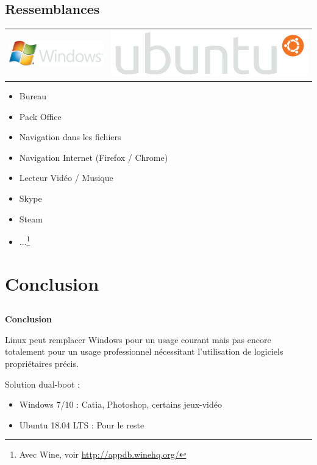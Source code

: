 \documentclass{beamer}
\begin{document}
\subsection{Ressemblances}
\begin{frame}
  
  \begin{center}
\begin{tabular}{c | c}
    \includegraphics[width=0.3\linewidth]{images/Windows_logo}&\includegraphics[width=0.25\linewidth]{images/Ubuntu_logo}
\end{tabular}
  \end{center}

  \begin{itemize}
  \item Bureau
  \item Pack Office
  \item Navigation dans les fichiers
  \item Navigation Internet (Firefox / Chrome)
  \item Lecteur Vid\'eo / Musique
  \item Skype
  \item Steam
  \item ...\footnote{Avec Wine, voir \url{http://appdb.winehq.org/}}
  \end{itemize}
\end{frame}


\section{Conclusion}
\subsection{}
\begin{frame}
  \begin{center}
    {\bf \huge Conclusion}
  \end{center}

  \begin{center}
    Linux peut remplacer Windows pour un usage courant mais pas encore totalement pour un usage professionnel n\'ecessitant l'utilisation de logiciels propri\'etaires précis.
\end{center}

  \begin{block}{ Solution dual-boot :}
    \begin{itemize}
    \item Windows 7/10 : Catia, Photoshop, certains jeux-vid\'eo
    \item Ubuntu 18.04 LTS : Pour le reste
    \end{itemize}
  \end{block}
\end{frame}
\end{document}

